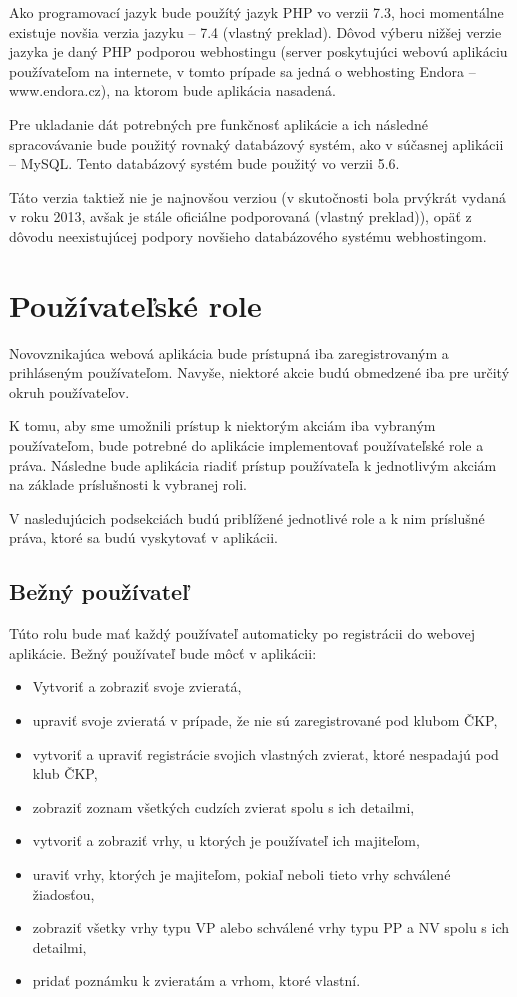 Ako programovací jazyk bude použítý jazyk PHP vo verzii 7.3, hoci momentálne existuje novšia verzia jazyku -- 7.4 \cite{verzie-php} (vlastný preklad).
Dôvod výberu nižšej verzie jazyka je daný PHP podporou webhostingu (server poskytujúci webovú aplikáciu používateľom na internete, v tomto prípade sa jedná o webhosting Endora -- www.endora.cz), na ktorom bude aplikácia nasadená.

Pre ukladanie dát potrebných pre funkčnosť aplikácie a ich následné spracovávanie bude použitý rovnaký databázový systém, ako v súčasnej aplikácii -- MySQL. Tento databázový systém bude použitý vo verzii 5.6.

Táto verzia taktiež nie je najnovšou verziou (v skutočnosti bola prvýkrát vydaná v roku 2013, avšak je stále oficiálne podporovaná \cite{verzie-mysql} (vlastný preklad)), opäť z dôvodu neexistujúcej podpory novšieho databázového systému webhostingom.

\pagebreak

\section{Používateľské role}\label{pouzivatelske-role}
Novovznikajúca webová aplikácia bude prístupná iba zaregistrovaným a prihláseným používateľom. Navyše, niektoré akcie budú obmedzené iba pre určitý okruh používateľov.

K tomu, aby sme umožnili prístup k niektorým akciám iba vybraným používateľom, bude potrebné do aplikácie implementovať používateľské role a práva. Následne bude aplikácia riadiť prístup používateľa k jednotlivým akciám na základe príslušnosti k vybranej roli.

V nasledujúcich podsekciách budú priblížené jednotlivé role a k nim príslušné práva, ktoré sa budú vyskytovať v aplikácii.

\subsection{Bežný používateľ}\label{bezny-pouzivatel}
Túto rolu bude mať každý používateľ automaticky po registrácii do webovej aplikácie. Bežný používateľ bude môcť v aplikácii: 

\begin{itemize}
	\item Vytvoriť a zobraziť svoje zvieratá,
	\item upraviť svoje zvieratá v prípade, že nie sú zaregistrované pod klubom ČKP,
	\item vytvoriť a upraviť registrácie svojich vlastných zvierat, ktoré nespadajú pod klub ČKP,
	\item zobraziť zoznam všetkých cudzích zvierat spolu s ich detailmi,
	\item vytvoriť a zobraziť vrhy, u ktorých je používateľ ich majiteľom,
	\item uraviť vrhy, ktorých je majiteľom, pokiaľ neboli tieto vrhy schválené žiadosťou,
	\item zobraziť všetky vrhy typu VP alebo schválené vrhy typu PP a NV spolu s ich detailmi,
	\item pridať poznámku k zvieratám a vrhom, ktoré vlastní.
\end{itemize}

